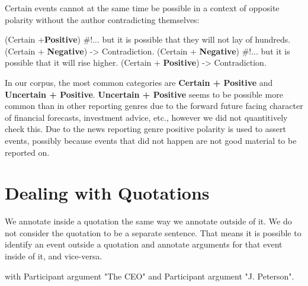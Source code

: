 Certain events cannot at the same time be possible in a context of opposite polarity without the author contradicting themselves:
\begin{exe}
    \ex {} (Certain +\textbf{Positive})
        \expl \#!... but it is possible that they will not lay of hundreds. (Certain + \textbf{Negative}) -> Contradiction.
    \ex {} (Certain + \textbf{Negative})
        \expl \#!... but it is possible that it will rise higher. (Certain + \textbf{Positive}) -> Contradiction.
\end{exe}

In our \project corpus, the most common categories are \textbf{Certain + Positive} and \textbf{Uncertain + Positive}.
\textbf{Uncertain + Positive} seems to be possible more common than in other reporting genres due to the forward future facing character of financial forecasts, investment advice, etc., however we did not quantitively check this.
Due to the news reporting genre positive polarity is used to assert events, possibly because events that did not happen are not good material to be reported on.

\section{Dealing with Quotations}

We annotate inside a quotation the same way we annotate outside of it. We do not consider the quotation to be a separate sentence. That means it is possible to identify an event outside a quotation and annotate arguments for that event inside of it, and vice-versa.

\begin{exe}
    \ex {}
        \expl {} with  Participant argument "The CEO" and  Participant argument "J. Peterson".
\end{exe}
